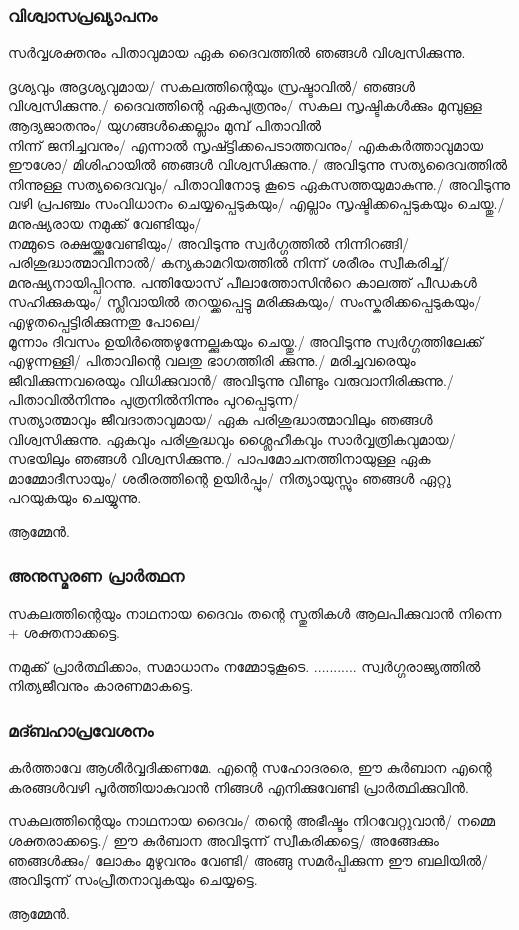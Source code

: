 \documentclass[20pt]{beamer}
\newcommand{\Priest}[1]{\color{white}#1}
\newcommand{\People}[1]{\color{yellow}#1}
\newcommand{\Server}[1]{\color{lightgray}#1}
\newcommand{\Ammen}{\People{ആമ്മേന്‍.}}
\begin{document}
\begin{frame}[allowframebreaks]
\frametitle{വിശ്വാസപ്രഖ്യാപനം}
\Priest{
സര്‍വ്വശക്തനും പിതാവുമായ ഏക ദൈവത്തില്‍ ഞങ്ങള്‍ വിശ്വസിക്കുന്നു.}\par
\People{
ദൃശ്യവും അദൃശ്യവുമായ/ സകലത്തിന്റെയും സ്രഷ്ടാവില്‍/
ഞങ്ങള്‍ വിശ്വസിക്കുന്നു./ ദൈവത്തിന്റെ ഏകപുത്രനും/
സകല സൃഷ്ടികള്‍ക്കും മുമ്പുള്ള ആദ്യജാതനും/
യുഗങ്ങള്‍ക്കെല്ലാം മുമ്പ് പിതാവില്‍ \\ \framebreak 
നിന്ന് ജനിച്ചവനും/ എന്നാല്‍ സൃഷ്ട്ടിക്കപെടാത്തവനും/
എകകര്‍ത്താവുമായ ഈശോ/ മിശിഹായില്‍ ഞങ്ങള്‍ വിശ്വസിക്കുന്നു./
അവിടുന്നു സത്യദൈവത്തില്‍ നിന്നുള്ള സത്യദൈവവും/
പിതാവിനോടു കൂടെ ഏകസത്തയുമാകുന്നു./
അവിടുന്നു വഴി പ്രപഞ്ചം സംവിധാനം ചെയ്യപ്പെടുകയും/
എല്ലാം സൃഷ്ടിക്കപ്പെടുകയും ചെയ്തു./ മനുഷ്യരായ നമുക്ക് വേണ്ടിയും/
\\ \framebreak 
നമ്മുടെ രക്ഷയ്ക്കുവേണ്ടിയും/ അവിടുന്നു 
സ്വര്‍ഗ്ഗത്തില്‍ നിന്നിറങ്ങി/ പരിശുദ്ധാത്മാവിനാല്‍/
കന്യകാമറിയത്തില്‍ നിന്ന് ശരീരം സ്വീകരിച്ച്/മനുഷ്യനായിപ്പിറന്നു.
പന്തിയോസ് പീലാത്തോസിന്‍റെ കാലത്ത്
പീഡകള്‍ സഹിക്കുകയും/ സ്ലീവായില്‍ തറയ്ക്കപ്പെട്ടു 
മരിക്കുകയും/ സംസ്കരിക്കപ്പെടുകയും/
എഴുതപ്പെട്ടിരിക്കുന്നതു പോലെ/\\ \framebreak
മൂന്നാം ദിവസം ഉയിര്‍ത്തെഴുന്നേല്ക്കുകയും ചെയ്തു./
അവിടുന്നു സ്വര്‍ഗ്ഗത്തിലേക്ക് എഴുന്നള്ളി/
പിതാവിന്റെ വലതു ഭാഗത്തിരി ക്കുന്നു./
മരിച്ചവരെയും ജീവിക്കുന്നവരെയും വിധിക്കുവാന്‍/
അവിടുന്നു വീണ്ടും വരുവാനിരിക്കുന്നു./
പിതാവില്‍നിന്നും പുത്രനില്‍നിന്നും പുറപ്പെടുന്ന/\\ \framebreak
സത്യാത്മാവും ജീവദാതാവുമായ/
ഏക പരിശുദ്ധാത്മാവിലും ഞങ്ങള്‍ വിശ്വസിക്കുന്നു.
ഏകവും പരിശുദ്ധവും ശ്ലൈഹീകവും സാര്‍വ്വത്രികവുമായ/
സഭയിലും ഞങ്ങള്‍ വിശ്വസിക്കുന്നു./
പാപമോചനത്തിനായുള്ള ഏക മാമ്മോദീസായും/
ശരീരത്തിന്റെ ഉയിര്‍പ്പും/ നിത്യായുസ്സും ഞങ്ങള്‍ ഏറ്റു
പറയുകയും ചെയ്യുന്നു.\par \Ammen}
\end{frame}


\begin{frame}[allowframebreaks]
\frametitle{അനുസ്മരണ പ്രാര്‍ത്ഥന}
\Priest{
സകലത്തിന്റെയും നാഥനായ ദൈവം തന്റെ സ്തുതികൾ ആലപിക്കുവാൻ നിന്നെ + ശക്തനാക്കട്ടെ.}\par
\Server{
നമുക്ക് പ്രാര്‍ത്ഥിക്കാം, സമാധാനം നമ്മോടുകൂടെ.
........... 
സ്വര്‍ഗ്ഗരാജ്യത്തില്‍ നിത്യജീവനും കാരണമാകട്ടെ.}
\end{frame}

\begin{frame}[allowframebreaks]
\frametitle{മദ്ബഹാപ്രവേശനം}
\Priest{
കര്‍ത്താവേ ആശീര്‍വ്വദിക്കണമേ. എന്റെ സഹോദരരെ,
ഈ കുര്‍ബാന എന്റെ കരങ്ങള്‍വഴി പൂര്‍ത്തിയാകുവാന്‍
നിങ്ങള്‍ എനിക്കുവേണ്ടി പ്രാര്‍ത്ഥിക്കുവിന്‍.}\par
\People{
സകലത്തിന്റെയും നാഥനായ ദൈവം/ തന്റെ അഭീഷ്ടം നിറവേറ്റുവാന്‍/
നമ്മെ ശക്തരാക്കട്ടെ./ ഈ കുര്‍ബാന അവിടുന്ന് സ്വീകരിക്കട്ടെ/
അങ്ങേക്കും ഞങ്ങള്‍ക്കും/ ലോകം മുഴുവനും വേണ്ടി/
അങ്ങു സമര്‍പ്പിക്കുന്ന ഈ ബലിയില്‍/ അവിടുന്ന് 
സംപ്രീതനാവുകയും ചെയ്യട്ടെ.\par\Ammen}
\end{frame}
\end{document}
